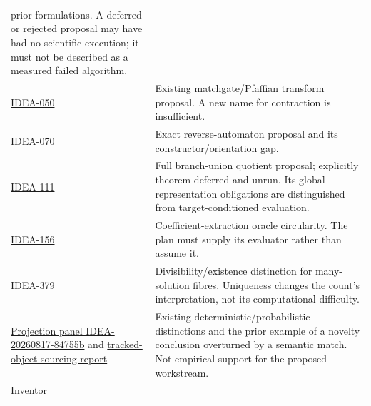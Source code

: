 \documentclass[
  10pt,
]{article}
\begin{document}
\begin{longtable}[]{@{}
  >{\raggedright\arraybackslash}p{}
  >{\raggedright\arraybackslash}p{}@{}}
prior formulations. A deferred or rejected proposal may have had no
scientific execution; it must not be described as a measured failed
algorithm. \\
\href{https://github.com/aburan28/crypto-autoresearcher/blob/ab0609ebee3d17527a51667591bda56f7cdece31/ideas/ECDLP-IDEA-050_spinor_matchgate_addition_transform_hypothesis.md}{IDEA-050}
& Existing matchgate/Pfaffian transform proposal. A new name for
contraction is insufficient. \\
\href{https://github.com/aburan28/crypto-autoresearcher/blob/ab0609ebee3d17527a51667591bda56f7cdece31/ideas/rejected/ECDLP-IDEA-070_p_kernel_reverse_automaton_hypothesis.md}{IDEA-070}
& Exact reverse-automaton proposal and its constructor/orientation
gap. \\
\href{https://github.com/aburan28/crypto-autoresearcher/blob/ab0609ebee3d17527a51667591bda56f7cdece31/ideas/deferred/ECDLP-IDEA-111_radical_montgomery_ladder_branch_ideal_quotient_hypothesis.md}{IDEA-111}
& Full branch-union quotient proposal; explicitly theorem-deferred and
unrun. Its global representation obligations are distinguished from
target-conditioned evaluation. \\
\href{https://github.com/aburan28/crypto-autoresearcher/blob/ab0609ebee3d17527a51667591bda56f7cdece31/ideas/rejected/ECDLP-IDEA-156_combinatorial_nullstellensatz_source_self_reduction_hypothesis.md}{IDEA-156}
& Coefficient-extraction oracle circularity. The plan must supply its
evaluator rather than assume it. \\
\href{https://github.com/aburan28/crypto-autoresearcher/blob/ab0609ebee3d17527a51667591bda56f7cdece31/ideas/rejected/ECDLP-IDEA-379_ax_katz_divisibility_source_locator_hypothesis.md}{IDEA-379}
& Divisibility/existence distinction for many-solution fibres.
Uniqueness changes the count's interpretation, not its computational
difficulty. \\
\href{https://github.com/aburan28/crypto-autoresearcher/blob/ab0609ebee3d17527a51667591bda56f7cdece31/ledger/proposals/IDEA-20260817-84755b.yaml}{Projection
panel IDEA-20260817-84755b} and
\href{https://github.com/aburan28/crypto-autoresearcher/blob/ab0609ebee3d17527a51667591bda56f7cdece31/research/ecdlp_tracked_object_enumeration_20260905.md}{tracked-object
sourcing report} & Existing deterministic/probabilistic distinctions and
the prior example of a novelty conclusion overturned by a semantic
match. Not empirical support for the proposed workstream. \\
\href{https://github.com/aburan28/crypto-autoresearcher/blob/ab0609ebee3d17527a51667591bda56f7cdece31/docs/inventor-protocol.md}{Inventor
}
\end{longtable}
\end{document}
